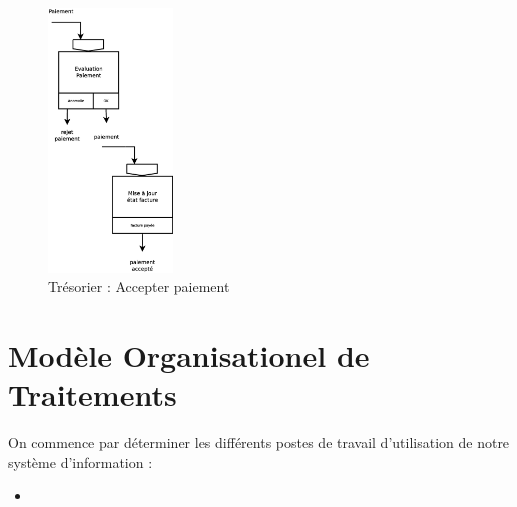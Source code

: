 \begin{figure}[!htb]
    \begin{center}
    \includegraphics[height=7cm]{images/cc1_mct4.eps}
    \caption{\label{cc1_mct3} Trésorier : Accepter paiement}
    \end{center}
\end{figure}

\newpage
\section*{Modèle Organisationel de Traitements}

On commence par déterminer les différents postes de travail d'utilisation de notre système d'information :\\

\begin{itemize}
    \item
\end{itemize}

\begin{figure}[!htb]
    \begin{center}
    \end{center}
\end{figure}

\begin{figure}[!htb]
    \begin{center}
    \end{center}
\end{figure}


